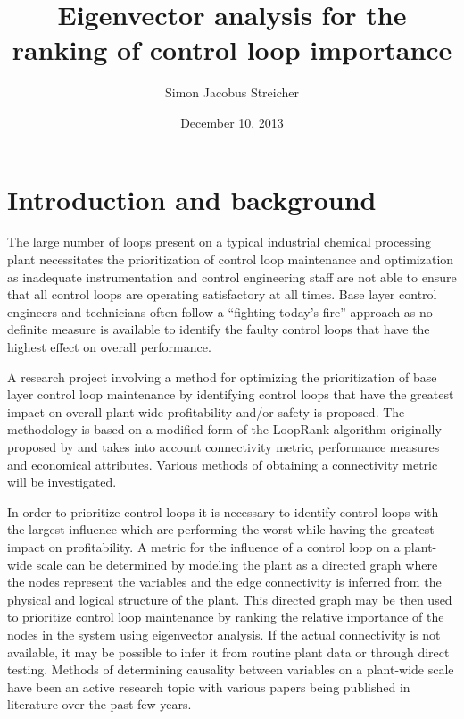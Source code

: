 \documentclass{article}
\newcommand{\subtitle}[1]{%
  \posttitle{%
    \par\end{center}
    \begin{center}\Large#1\end{center}
    \vskip0.5em}%
  }
\begin{document}


\title{Eigenvector analysis for the ranking of control loop importance}
\subtitle{Research proposal}
\date{December 10, 2013}
\author{Simon Jacobus Streicher}
\maketitle
\thispagestyle{empty}

\newpage

\tableofcontents
\thispagestyle{empty}




\newpage
{}
\pagestyle{fancy}

\section{Introduction and background}

The large number of loops present on a typical industrial chemical processing plant necessitates the prioritization of control loop maintenance and optimization as inadequate instrumentation and control engineering staff are not able to ensure that all control loops are operating satisfactory at all times.
Base layer control engineers and technicians often follow a “fighting today's fire” approach as no definite measure is available to identify the faulty control loops that have the highest effect on overall performance.

A research project involving a method for optimizing the prioritization of base layer control loop maintenance by identifying control loops that have the greatest impact on overall plant-wide profitability and/or safety is proposed.
The methodology is based on a modified form of the LoopRank algorithm originally proposed by \citet{Farenzena2009} and takes into account connectivity metric, performance measures and economical attributes.
Various methods of obtaining a connectivity metric will be investigated.

In order to prioritize control loops it is necessary to identify control loops with the largest influence which are performing the worst while having the greatest impact on profitability.
A metric for the influence of a control loop on a plant-wide scale can be determined by modeling the plant as a directed graph where the nodes represent the variables and the edge connectivity is inferred from the physical and logical structure of the plant.
This directed graph may be then used to prioritize control loop maintenance by ranking the relative importance of the nodes in the system using eigenvector analysis.
If the actual connectivity is not available, it may be possible to infer it from routine plant data or through direct testing.
Methods of determining causality between variables on a plant-wide scale have been an active research topic with various papers being published in literature over the past few years.
\end{document}
